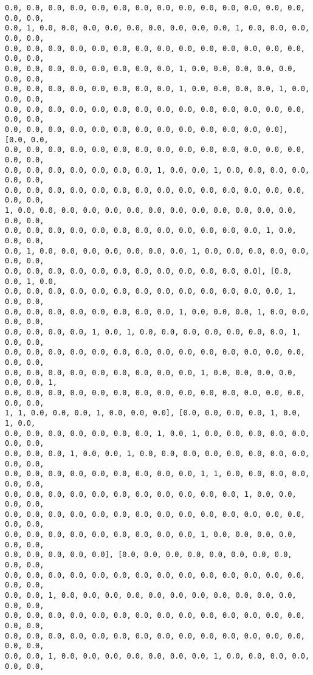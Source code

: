 \documentclass[11pt]{article}
\begin{document}
\begin{Verbatim}[commandchars=\\\{\}]
0.0, 0.0, 0.0, 0.0, 0.0, 0.0, 0.0, 0.0, 0.0, 0.0, 0.0, 0.0, 0.0, 0.0, 0.0, 0.0,
0.0, 1, 0.0, 0.0, 0.0, 0.0, 0.0, 0.0, 0.0, 0.0, 0.0, 1, 0.0, 0.0, 0.0, 0.0, 0.0,
0.0, 0.0, 0.0, 0.0, 0.0, 0.0, 0.0, 0.0, 0.0, 0.0, 0.0, 0.0, 0.0, 0.0, 0.0, 0.0,
0.0, 0.0, 0.0, 0.0, 0.0, 0.0, 0.0, 0.0, 1, 0.0, 0.0, 0.0, 0.0, 0.0, 0.0, 0.0,
0.0, 0.0, 0.0, 0.0, 0.0, 0.0, 0.0, 0.0, 1, 0.0, 0.0, 0.0, 0.0, 1, 0.0, 0.0, 0.0,
0.0, 0.0, 0.0, 0.0, 0.0, 0.0, 0.0, 0.0, 0.0, 0.0, 0.0, 0.0, 0.0, 0.0, 0.0, 0.0,
0.0, 0.0, 0.0, 0.0, 0.0, 0.0, 0.0, 0.0, 0.0, 0.0, 0.0, 0.0, 0.0], [0.0, 0.0,
0.0, 0.0, 0.0, 0.0, 0.0, 0.0, 0.0, 0.0, 0.0, 0.0, 0.0, 0.0, 0.0, 0.0, 0.0, 0.0,
0.0, 0.0, 0.0, 0.0, 0.0, 0.0, 0.0, 1, 0.0, 0.0, 1, 0.0, 0.0, 0.0, 0.0, 0.0, 0.0,
0.0, 0.0, 0.0, 0.0, 0.0, 0.0, 0.0, 0.0, 0.0, 0.0, 0.0, 0.0, 0.0, 0.0, 0.0, 0.0,
1, 0.0, 0.0, 0.0, 0.0, 0.0, 0.0, 0.0, 0.0, 0.0, 0.0, 0.0, 0.0, 0.0, 0.0, 0.0,
0.0, 0.0, 0.0, 0.0, 0.0, 0.0, 0.0, 0.0, 0.0, 0.0, 0.0, 0.0, 1, 0.0, 0.0, 0.0,
0.0, 1, 0.0, 0.0, 0.0, 0.0, 0.0, 0.0, 0.0, 1, 0.0, 0.0, 0.0, 0.0, 0.0, 0.0, 0.0,
0.0, 0.0, 0.0, 0.0, 0.0, 0.0, 0.0, 0.0, 0.0, 0.0, 0.0, 0.0], [0.0, 0.0, 1, 0.0,
0.0, 0.0, 0.0, 0.0, 0.0, 0.0, 0.0, 0.0, 0.0, 0.0, 0.0, 0.0, 0.0, 1, 0.0, 0.0,
0.0, 0.0, 0.0, 0.0, 0.0, 0.0, 0.0, 0.0, 1, 0.0, 0.0, 0.0, 1, 0.0, 0.0, 0.0, 0.0,
0.0, 0.0, 0.0, 0.0, 1, 0.0, 1, 0.0, 0.0, 0.0, 0.0, 0.0, 0.0, 0.0, 1, 0.0, 0.0,
0.0, 0.0, 0.0, 0.0, 0.0, 0.0, 0.0, 0.0, 0.0, 0.0, 0.0, 0.0, 0.0, 0.0, 0.0, 0.0,
0.0, 0.0, 0.0, 0.0, 0.0, 0.0, 0.0, 0.0, 0.0, 1, 0.0, 0.0, 0.0, 0.0, 0.0, 0.0, 1,
0.0, 0.0, 0.0, 0.0, 0.0, 0.0, 0.0, 0.0, 0.0, 0.0, 0.0, 0.0, 0.0, 0.0, 0.0, 0.0,
1, 1, 0.0, 0.0, 0.0, 1, 0.0, 0.0, 0.0], [0.0, 0.0, 0.0, 0.0, 1, 0.0, 1, 0.0,
0.0, 0.0, 0.0, 0.0, 0.0, 0.0, 0.0, 1, 0.0, 1, 0.0, 0.0, 0.0, 0.0, 0.0, 0.0, 0.0,
0.0, 0.0, 0.0, 1, 0.0, 0.0, 1, 0.0, 0.0, 0.0, 0.0, 0.0, 0.0, 0.0, 0.0, 0.0, 0.0,
0.0, 0.0, 0.0, 0.0, 0.0, 0.0, 0.0, 0.0, 0.0, 1, 1, 0.0, 0.0, 0.0, 0.0, 0.0, 0.0,
0.0, 0.0, 0.0, 0.0, 0.0, 0.0, 0.0, 0.0, 0.0, 0.0, 0.0, 1, 0.0, 0.0, 0.0, 0.0,
0.0, 0.0, 0.0, 0.0, 0.0, 0.0, 0.0, 0.0, 0.0, 0.0, 0.0, 0.0, 0.0, 0.0, 0.0, 0.0,
0.0, 0.0, 0.0, 0.0, 0.0, 0.0, 0.0, 0.0, 0.0, 1, 0.0, 0.0, 0.0, 0.0, 0.0, 0.0,
0.0, 0.0, 0.0, 0.0, 0.0], [0.0, 0.0, 0.0, 0.0, 0.0, 0.0, 0.0, 0.0, 0.0, 0.0,
0.0, 0.0, 0.0, 0.0, 0.0, 0.0, 0.0, 0.0, 0.0, 0.0, 0.0, 0.0, 0.0, 0.0, 0.0, 0.0,
0.0, 0.0, 1, 0.0, 0.0, 0.0, 0.0, 0.0, 0.0, 0.0, 0.0, 0.0, 0.0, 0.0, 0.0, 0.0,
0.0, 0.0, 0.0, 0.0, 0.0, 0.0, 0.0, 0.0, 0.0, 0.0, 0.0, 0.0, 0.0, 0.0, 0.0, 0.0,
0.0, 0.0, 0.0, 0.0, 0.0, 0.0, 0.0, 0.0, 0.0, 0.0, 0.0, 0.0, 0.0, 0.0, 0.0, 0.0,
0.0, 0.0, 1, 0.0, 0.0, 0.0, 0.0, 0.0, 0.0, 0.0, 1, 0.0, 0.0, 0.0, 0.0, 0.0, 0.0,

\end{Verbatim}
\end{document}
